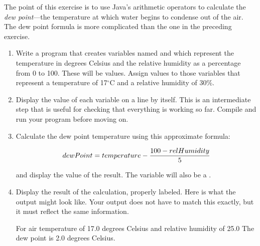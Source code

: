 \begin{exercise}
\label{ex:dewpoint}
The point of this exercise is to use Java's arithmetic operators to calculate the {\it dew point}---the temperature at which water begins to condense out of the air. The dew point formula is more complicated than the one in the preceding exercise.

\begin{enumerate}

\item Write a program that creates variables named  and  which represent the temperature in degrees Celsius and the relative humidity as a percentage from 0 to 100. These will be  values. Assign values to those variables that represent a temperature of 17$^\circ$C and a relative humidity of 30\%.

\item Display the value of each variable on a line by itself.
This is an intermediate step that is useful for checking that everything is working so far.
Compile and run your program before moving on.

\item Calculate the dew point temperature using this approximate formula:

\begin{equation*}
dewPoint = temperature - {{100 - relHumidity} \over 5}
\end{equation*}

and display the value of the result. The  variable will also be a .

\item Display the result of the calculation, properly labeled. Here is what the output might look like. Your output does not have to match
this exactly, but it must reflect the same information.

\begin{stdout}
For air temperature of 17.0 degrees Celsius
and relative humidity of 25.0%
The dew point is 2.0 degrees Celsius.
\end{stdout}
\end{enumerate}

\end{exercise}

